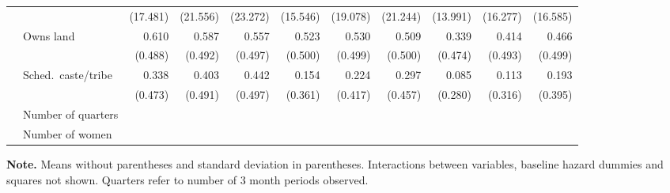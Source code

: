 \begin{table}
\begin{center}
\begin{scriptsize}
\begin{threeparttable}
\begin{tabular} {@{} c l D{.}{.}{1.3} D{.}{.}{1.3} D{.}{.}{1.3} D{.}{.}{1.3} D{.}{.}{1.3} D{.}{.}{1.3} D{.}{.}{1.3} D{.}{.}{1.3} D{.}{.}{1.3} @{}}
                    &                     &    (17.481)         &    (21.556)         &    (23.272)         &    (15.546)         &    (19.078)         &    (21.244)         &    (13.991)         &    (16.277)         &    (16.585)         \\
                    & Owns land           &       0.610         &       0.587         &       0.557         &       0.523         &       0.530         &       0.509         &       0.339         &       0.414         &       0.466         \\
                    &                     &     (0.488)         &     (0.492)         &     (0.497)         &     (0.500)         &     (0.499)         &     (0.500)         &     (0.474)         &     (0.493)         &     (0.499)         \\
                    & Sched.\ caste/tribe &       0.338         &       0.403         &       0.442         &       0.154         &       0.224         &       0.297         &       0.085         &       0.113         &       0.193         \\
                    &                     &     (0.473)         &     (0.491)         &     (0.497)         &     (0.361)         &     (0.417)         &     (0.457)         &     (0.280)         &     (0.316)         &     (0.395)         \\
                    & Number of quarters  &  &  &  &  &  &  &  &  &  \\
                    & Number of women     &  &  &  &  &  &  &  &  &  \\
\bottomrule
\end{tabular}
\begin{tablenotes} \tiny
\item \hspace*{-0.7em} \textbf{Note.}
Means without parentheses and standard deviation in parentheses.
Interactions between variables, baseline hazard dummies and squares not shown.
Quarters refer to number of 3 month periods observed.
\end{tablenotes}
\end{threeparttable}
\end{scriptsize}
\end{center}
\end{table}
